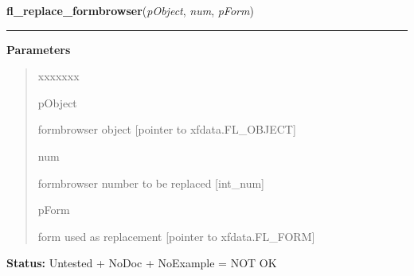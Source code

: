\hspace{.8\funcindent}\begin{boxedminipage}{\funcwidth}

    \raggedright \textbf{fl\_replace\_formbrowser}(\textit{pObject}, \textit{num}, \textit{pForm})

    \vspace{-1.5ex}

    \rule{\textwidth}{0.5\fboxrule}
\setlength{\parskip}{2ex}
\setlength{\parskip}{1ex}
      \textbf{Parameters}
      \vspace{-1ex}

      \begin{quote}
        \begin{Ventry}{xxxxxxx}

          \item[pObject]

          formbrowser object [pointer to xfdata.FL\_OBJECT]

          \item[num]

          formbrowser number to be replaced [int\_num]

          \item[pForm]

          form used as replacement [pointer to xfdata.FL\_FORM]

        \end{Ventry}

      \end{quote}

\textbf{Status:} Untested + NoDoc + NoExample = NOT OK



    \end{boxedminipage}

    \label{xformslib:library:fl_insert_formbrowser}

    \vspace{0.5ex}

